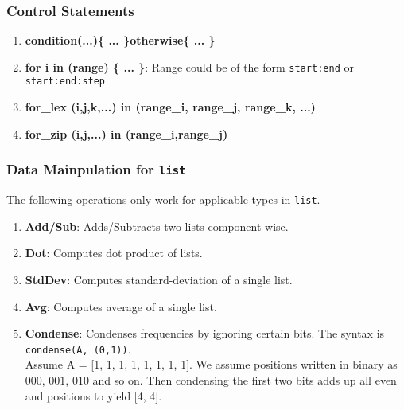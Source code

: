 \documentclass{article}
\begin{document}
\subsubsection{Control Statements}
\begin{enumerate}
	\item \textbf{condition(...)\{ ... \}otherwise\{ ... \}}
	\item \textbf{for i in (range) \{ ... \}}: Range could be of the form \texttt{start:end} or \texttt{start:end:step}
	\item \textbf{for\_lex (i,j,k,...) in (range\_i, range\_j, range\_k, ...)}
	\item \textbf{for\_zip (i,j,...) in (range\_i,range\_j)}
\end{enumerate}

\subsubsection{Data Mainpulation for \texttt{list}}
The following operations only work for applicable types in \texttt{list}.
\begin{enumerate}
	\item \textbf{Add/Sub}: Adds/Subtracts two lists component-wise.
	\item \textbf{Dot}: Computes dot product of lists.
	\item \textbf{StdDev}: Computes standard-deviation of a single list.
	\item \textbf{Avg}: Computes average of a single list.
	\item \textbf{Condense}: Condenses frequencies by ignoring certain bits. The syntax is \texttt{condense(A, (0,1))}. \\
		Assume A = [1, 1, 1, 1, 1, 1, 1, 1]. We assume positions written in binary as $000$, $001$, $010$ and so on. Then condensing the first two bits adds up all even and positions to yield [4, 4].
\end{enumerate}
\end{document}
